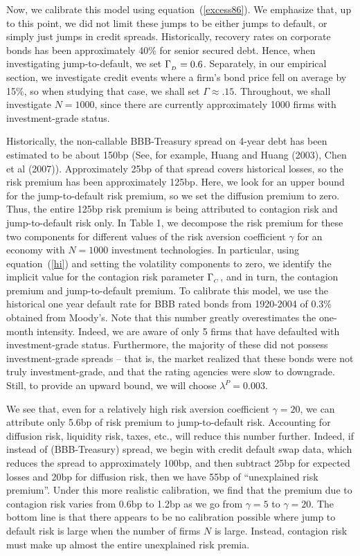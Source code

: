 \documentclass[titlepage,11pt]{article}
\begin{document}
Now, we calibrate this model using equation~(\ref{excess86}).  We emphasize that, up
to this point, we did not limit these jumps to be either jumps to default, or simply just
jumps in credit spreads.  Historically, recovery rates on corporate bonds has been approximately
40\% for senior secured debt.  Hence, when investigating jump-to-default, we set
$\Gamma_{_{{D}}} = 0.6$.  Separately, in our empirical section, we investigate credit events where
a firm's bond price fell on average by 15\%, so when studying that case, we shall set $\Gamma \approx .15$.
Throughout, we shall investigate $N = 1000$, since there are currently
approximately 1000 firms with investment-grade status.

Historically, the non-callable BBB-Treasury spread on 4-year debt has been estimated
to be about 150bp (See, for example, Huang and Huang (2003), Chen et al (2007)).  Approximately
25bp of that spread covers historical losses, so the risk premium has been approximately 125bp.
Here, we look for an upper bound for the jump-to-default risk premium, so we set the diffusion
premium to zero.  Thus, the entire 125bp risk premium is being attributed to contagion risk and jump-to-default
risk only.  In Table 1, we decompose the risk premium for these two components
for different values of the risk aversion coefficient $\gamma$ for an economy with $N = 1000$
investment technologies. In particular, using equation~(\ref{hi}) and setting the
volatility components to zero, we identify the implicit value for the contagion risk parameter
$\Gamma_{_{{C}}}$, and in turn, the contagion premium and jump-to-default premium.  To calibrate
this model, we use the historical one year default rate
for BBB rated bonds from 1920-2004 of 0.3\% obtained from Moody's.  Note that this number greatly
overestimates the one-month intensity.
Indeed, we are aware of only 5 firms that have defaulted with investment-grade status.
Furthermore, the majority of these did not possess investment-grade spreads -- that is, the market
realized that these bonds were not truly investment-grade, and that the rating
agencies were slow to downgrade.  Still, to
provide an upward bound, we will choose $\lambda^{P} = 0.003$.

We see that, even for a relatively
high risk aversion coefficient $\gamma = 20$, we can attribute only 5.6bp of risk premium to jump-to-default
risk.  Accounting for diffusion risk, liquidity risk, taxes, etc., will reduce this number further.
Indeed, if instead of (BBB-Treasury) spread, we begin with credit default swap data, which
reduces the spread to approximately 100bp, and then subtract 25bp for expected losses and 20bp for diffusion
risk, then we have 55bp of ``unexplained risk premium''.  Under this more realistic calibration,
we find that the premium due to contagion risk varies from 0.6bp to 1.2bp as we go from $\gamma = 5$ to
$\gamma = 20$.  The bottom line is that there appears to be no calibration possible where jump to
default risk is large when the number of firms $N$ is large.  Instead, contagion risk must make up
almost the entire unexplained risk premia.
\end{document}
